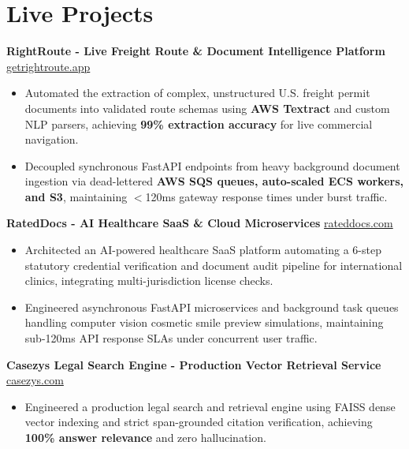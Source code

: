 \documentclass[9.5pt,a4paper]{article}
\begin{document}
\section*{Live Projects}
\noindent
\textbf{RightRoute - Live Freight Route \& Document Intelligence Platform} \hfill \href{https://getrightroute.app}{getrightroute.app}
\begin{itemize}
    \item Automated the extraction of complex, unstructured U.S. freight permit documents into validated route schemas using \textbf{AWS Textract} and custom NLP parsers, achieving \textbf{99\% extraction accuracy} for live commercial navigation.
    \item Decoupled synchronous FastAPI endpoints from heavy background document ingestion via dead-lettered \textbf{AWS SQS queues, auto-scaled ECS workers, and S3}, maintaining $<$120ms gateway response times under burst traffic.
\end{itemize}
\vspace{0.6pt}
\noindent
\textbf{RatedDocs - AI Healthcare SaaS \& Cloud Microservices} \hfill \href{https://rateddocs.com}{rateddocs.com}
\begin{itemize}
    \item Architected an AI-powered healthcare SaaS platform automating a 6-step statutory credential verification and document audit pipeline for international clinics, integrating multi-jurisdiction license checks.
    \item Engineered asynchronous FastAPI microservices and background task queues handling computer vision cosmetic smile preview simulations, maintaining sub-120ms API response SLAs under concurrent user traffic.
\end{itemize}
\vspace{0.6pt}
\noindent
\textbf{Casezys Legal Search Engine - Production Vector Retrieval Service} \hfill \href{https://casezys.com}{casezys.com}
\begin{itemize}
    \item Engineered a production legal search and retrieval engine using FAISS dense vector indexing and strict span-grounded citation verification, achieving \textbf{100\% answer relevance} and zero hallucination.
\end{itemize}
\vspace{0.6pt}
\end{document}
